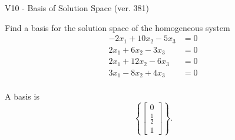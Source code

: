 \begin{exercise}
  \begin{exerciseTitle}V10 - Basis of Solution Space (ver. 381)\end{exerciseTitle}
  \begin{exerciseStatement}
    Find a basis for the solution space of the homogeneous system 
\begin{align*}
 -2 x_ 1 + 10 x_ 2 -5 x_ 3 &= 0  \\ 
  2 x_ 1 + 6 x_ 2 -3 x_ 3 &= 0  \\ 
  2 x_ 1 + 12 x_ 2 -6 x_ 3 &= 0  \\ 
  3 x_ 1 -8 x_ 2 + 4 x_ 3 &= 0  \\ 
 \end{align*}


 
  \end{exerciseStatement}

  \begin{exerciseAnswer}
   A basis is   
\[\left\{\left[\begin{array}{c}
0 \\
\frac{1}{2} \\
1
\end{array}\right]\right\}.\]

  


  \end{exerciseAnswer}
\end{exercise}